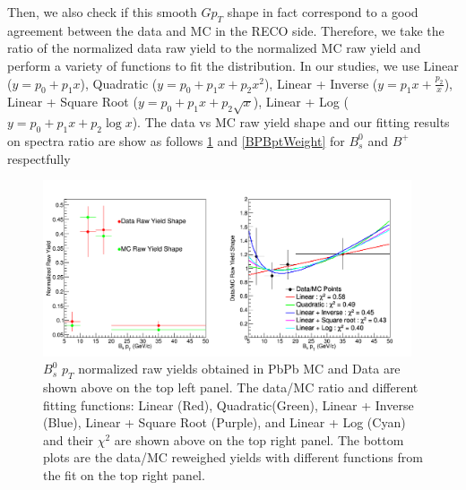 Then, we also check if this smooth $Gp_T$ shape in fact correspond to a good agreement between the data and MC in the RECO side. Therefore, we take the ratio of the normalized data raw yield to the normalized MC raw yield and perform a variety of functions to fit the distribution. In our studies, we use Linear ($y = p_0 + p_1 x$), Quadratic ($y = p_0 + p_1 x + p_2 x^2$), Linear + Inverse  ($y = p_1 x + \frac{p_2}{x}$), Linear + Square Root ($y = p_0 + p_1 x + p_2 \sqrt{x}$), Linear + Log ($y = p_0 + p_1 x + p_2 \log{x}$). The data vs MC raw yield shape and our fitting results on spectra ratio are show as follows \ref{BsBptWeight} and  \ref{BPBptWeight} for $B^0_s$ and $B^+$ respectfully 



\begin{figure}[h]
\begin{center}
\includegraphics[width= 0.97\textwidth]{Figures/Chapter4/BsBptDataMC.png}
\caption{ $B^0_s$ $p_T$ normalized raw yields obtained in PbPb MC and Data are shown above on the top left panel. The data/MC ratio and different fitting functions: Linear (Red), Quadratic(Green), Linear + Inverse (Blue), Linear + Square Root (Purple), and Linear + Log (Cyan) and their $\chi^2$ are shown above on the top right panel. The bottom plots are the data/MC reweighed yields with different functions from the fit on the top right panel.}
\label{BsBptWeight}
\end{center}
\end{figure}

